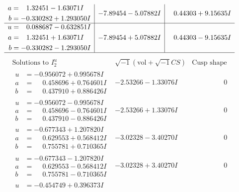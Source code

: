 \documentclass[1p]{elsarticle_modified}
\theoremstyle{definition}
\newcommand{\I}{\sqrt{-1}}
\begin{document}
$$\begin{array}{c|c|c}
\begin{aligned}
a &= \phantom{-}1.32451 - 1.63071 I \\
b &= -0.330282 + 1.293050 I\end{aligned}
 & -7.89454 - 5.07882 I & \phantom{-}0.44303 + 9.15635 I \\ \hline\begin{aligned}
u &= \phantom{-}0.088687 - 0.632851 I \\
a &= \phantom{-}1.32451 + 1.63071 I \\
b &= -0.330282 - 1.293050 I\end{aligned}
 & -7.89454 + 5.07882 I & \phantom{-}0.44303 - 9.15635 I\\
 \hline 
 \end{array}$$\newpage$$\begin{array}{c|c|c}  
\text{Solutions to }I^u_{2}& \I (\text{vol} + \sqrt{-1}CS) & \text{Cusp shape}\\
 \hline 
\begin{aligned}
u &= -0.956072 + 0.995678 I \\
a &= \phantom{-}0.458696 + 0.764601 I \\
b &= \phantom{-}0.437910 + 0.886426 I\end{aligned}
 & -2.53266 - 1.33076 I & \phantom{-0.000000 } 0 \\ \hline\begin{aligned}
u &= -0.956072 - 0.995678 I \\
a &= \phantom{-}0.458696 - 0.764601 I \\
b &= \phantom{-}0.437910 - 0.886426 I\end{aligned}
 & -2.53266 + 1.33076 I & \phantom{-0.000000 } 0 \\ \hline\begin{aligned}
u &= -0.677343 + 1.207820 I \\
a &= \phantom{-}0.629553 + 0.568412 I \\
b &= \phantom{-}0.755781 + 0.710365 I\end{aligned}
 & -3.02328 - 3.40270 I & \phantom{-0.000000 } 0 \\ \hline\begin{aligned}
u &= -0.677343 - 1.207820 I \\
a &= \phantom{-}0.629553 - 0.568412 I \\
b &= \phantom{-}0.755781 - 0.710365 I\end{aligned}
 & -3.02328 + 3.40270 I & \phantom{-0.000000 } 0 \\ \hline\begin{aligned}
u &= -0.454749 + 0.396373 I \\

\end{aligned}
\end{array}$$
\end{document}
